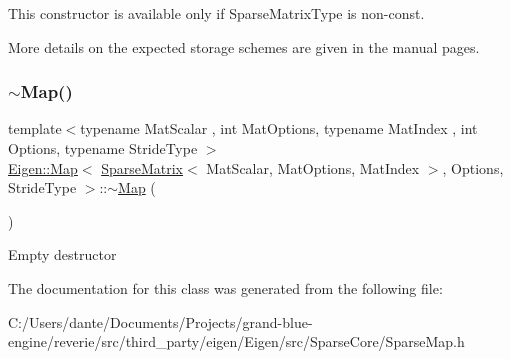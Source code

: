 This constructor is available only if {\ttfamily Sparse\+Matrix\+Type} is non-\/const.

More details on the expected storage schemes are given in the manual pages. \mbox{\label{class_eigen_1_1_map_3_01_sparse_matrix_3_01_mat_scalar_00_01_mat_options_00_01_mat_index_01_4_002c859b470cc9e43a031929bd752a93e6_a4d2900fdd8c973d24c4cfb0f0ee4f53f}} 
\subsubsection{\texorpdfstring{$\sim$Map()}{~Map()}}
{\footnotesize\ttfamily template$<$typename Mat\+Scalar , int Mat\+Options, typename Mat\+Index , int Options, typename Stride\+Type $>$ \\
\mbox{\hyperlink{class_eigen_1_1_map}{Eigen\+::\+Map}}$<$ \mbox{\hyperlink{class_eigen_1_1_sparse_matrix}{Sparse\+Matrix}}$<$ Mat\+Scalar, Mat\+Options, Mat\+Index $>$, Options, Stride\+Type $>$\+::$\sim$\mbox{\hyperlink{class_eigen_1_1_map}{Map}} (\begin{DoxyParamCaption}{ }\end{DoxyParamCaption})\hspace{0.3cm}{\ttfamily [inline]}}

Empty destructor 

The documentation for this class was generated from the following file\+:\begin{DoxyCompactItemize}
\item 
C\+:/\+Users/dante/\+Documents/\+Projects/grand-\/blue-\/engine/reverie/src/third\+\_\+party/eigen/\+Eigen/src/\+Sparse\+Core/Sparse\+Map.\+h\end{DoxyCompactItemize}
